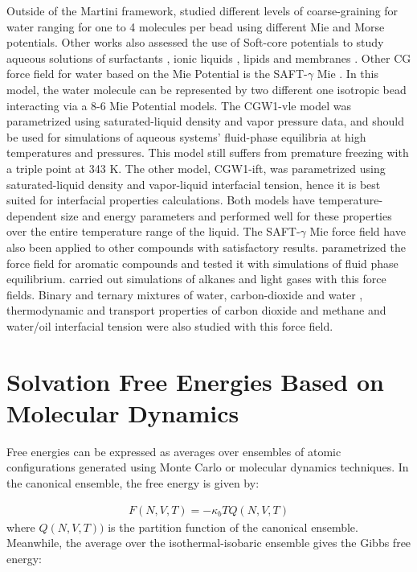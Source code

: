 Outside of the Martini framework,  studied different levels of coarse-graining for water ranging for one to 4 molecules per bead using different Mie and Morse potentials. Other works also assessed the use of Soft-core potentials to study aqueous solutions of surfactants \cite{shinoda2007}, ionic liquids \cite{bhargava2009}, lipids \cite{shinoda20102} and membranes \cite{pantano2009}. Other CG force field for water based on the Mie Potential is the SAFT-$\gamma$ Mie \cite{lobanova2015}. In this model, the water molecule can be represented by two different one isotropic bead interacting via a 8-6 Mie Potential models. The CGW1-vle model was parametrized using saturated-liquid density and vapor pressure data, and should be used for simulations of aqueous systems' fluid-phase equilibria at high temperatures and pressures. This model still suffers from premature freezing with a triple point at 343 K. The other model, CGW1-ift, was parametrized using saturated-liquid density and vapor-liquid interfacial tension, hence it is best suited for interfacial properties calculations. Both models have temperature-dependent size and energy parameters and performed well for these properties over the entire temperature range of the liquid. The SAFT-$\gamma$ Mie force field have also been applied to other compounds with satisfactory results.  parametrized the force field for aromatic compounds and tested it with simulations of fluid phase equilibrium.  carried out simulations of alkanes and light gases with this force fields. Binary and ternary mixtures of water, carbon-dioxide and water \cite{lobanova2016}, thermodynamic and transport properties of carbon dioxide and methane \cite{cassiano1,cassiano2} and water/oil interfacial tension \cite{herdes2017} were also studied with this force field.   

\section{Solvation Free Energies Based on Molecular Dynamics}

Free energies can be expressed as averages over ensembles of atomic configurations generated using Monte Carlo or molecular dynamics techniques. In the canonical ensemble, the free energy is given by:  

\begin{equation}
\label{eq:fcano}
\begin{aligned}
F(N,V,T) = -\kappa_{b}TQ(N,V,T)
\end{aligned}
\end{equation}
where $Q(N,V,T))$ is the partition function of the canonical ensemble. Meanwhile, the average over the isothermal-isobaric ensemble gives the Gibbs free energy:

